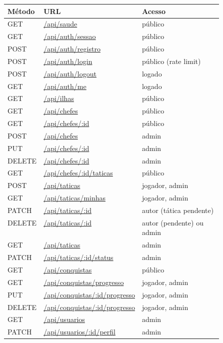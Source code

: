 \begin{longtable}[]{@{}llp{0.5\linewidth}@{}}
\toprule\noalign{}
Método & URL & Acesso \\
\midrule\noalign{}
\endhead
\bottomrule\noalign{}
\endlastfoot
GET & \protect\hyperlink{get-apisaude}{/api/saude} & público \\
GET & \protect\hyperlink{get-apiauthsessao}{/api/auth/sessao} &
público \\
POST & \protect\hyperlink{post-apiauthregistro}{/api/auth/registro} &
público \\
POST & \protect\hyperlink{post-apiauthlogin}{/api/auth/login} & público
(rate limit) \\
POST & \protect\hyperlink{post-apiauthlogout}{/api/auth/logout} &
logado \\
GET & \protect\hyperlink{get-apiauthme}{/api/auth/me} & logado \\
GET & \protect\hyperlink{get-apiilhas}{/api/ilhas} & público \\
GET & \protect\hyperlink{get-apichefes}{/api/chefes} & público \\
GET & \protect\hyperlink{get-apichefesid}{/api/chefes/:id} & público \\
POST & \protect\hyperlink{post-apichefes}{/api/chefes} & admin \\
PUT & \protect\hyperlink{put-apichefesid}{/api/chefes/:id} & admin \\
DELETE & \protect\hyperlink{delete-apichefesid}{/api/chefes/:id} &
admin \\
GET &
\protect\hyperlink{get-apichefesidtaticas}{/api/chefes/:id/taticas} &
público \\
POST & \protect\hyperlink{post-apitaticas}{/api/taticas} & jogador,
admin \\
GET & \protect\hyperlink{get-apitaticasminhas}{/api/taticas/minhas} &
jogador, admin \\
PATCH & \protect\hyperlink{patch-apitaticasid}{/api/taticas/:id} & autor
(tática pendente) \\
DELETE & \protect\hyperlink{delete-apitaticasid}{/api/taticas/:id} &
autor (pendente) ou admin \\
GET & \protect\hyperlink{get-apitaticas}{/api/taticas} & admin \\
PATCH &
\protect\hyperlink{patch-apitaticasidstatus}{/api/taticas/:id/status} &
admin \\
GET & \protect\hyperlink{get-apiconquistas}{/api/conquistas} &
público \\
GET &
\protect\hyperlink{get-apiconquistasprogresso}{/api/conquistas/progresso}
& jogador, admin \\
PUT &
\protect\hyperlink{put-apiconquistasidprogresso}{/api/conquistas/:id/progresso}
& jogador, admin \\
DELETE &
\protect\hyperlink{delete-apiconquistasidprogresso}{/api/conquistas/:id/progresso}
& jogador, admin \\
GET & \protect\hyperlink{get-apiusuarios}{/api/usuarios} & admin \\
PATCH &
\protect\hyperlink{patch-apiusuariosidperfil}{/api/usuarios/:id/perfil}
& admin \\
\end{longtable}

